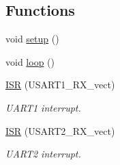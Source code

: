 \subsection*{Functions}
\begin{DoxyCompactItemize}
\item 
void \mbox{\hyperlink{_a_d_a_s___nav_u_8ino_a4fc01d736fe50cf5b977f755b675f11d}{setup}} ()
\item 
void \mbox{\hyperlink{_a_d_a_s___nav_u_8ino_afe461d27b9c48d5921c00d521181f12f}{loop}} ()
\item 
\mbox{\hyperlink{_a_d_a_s___nav_u_8ino_ae6e8a8009a9ae0c59f25a496d1cf5a84}{I\+SR}} (U\+S\+A\+R\+T1\+\_\+\+R\+X\+\_\+vect)
\begin{DoxyCompactList}\small\item\em U\+A\+R\+T1 interrupt. \end{DoxyCompactList}\item 
\mbox{\hyperlink{_a_d_a_s___nav_u_8ino_a63a86aad9ba2e355fe6380da553f554e}{I\+SR}} (U\+S\+A\+R\+T2\+\_\+\+R\+X\+\_\+vect)
\begin{DoxyCompactList}\small\item\em U\+A\+R\+T2 interrupt. \end{DoxyCompactList}\end{DoxyCompactItemize}
